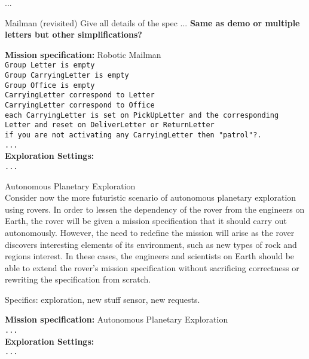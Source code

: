 ...

\begin{myExample}\label{Ex:mailman3} Mailman (revisited)
	Give all details of the spec ... \textbf{Same as demo or multiple letters but other simplifications?}
\end{myExample}

\begin{algorithm}
	\textbf{Mission specification:} Robotic Mailman\\
	{\small
	\texttt{Group Letter is empty}\\
	\texttt{Group CarryingLetter is empty}\\
	\texttt{Group Office is empty}\\
	\texttt{CarryingLetter correspond to Letter}\\
	\texttt{CarryingLetter correspond to Office}\\
	\texttt{each CarryingLetter is set on PickUpLetter and the corresponding Letter and reset on 			DeliverLetter or ReturnLetter}\\
	
	\texttt{if you are not activating any CarryingLetter then "patrol"?.}\\
	\texttt{...}\\
	}
	\textbf{Exploration Settings:}\\
	{\small
	\texttt{...} 
	}
\end{algorithm}

\begin{myExample}\label{Ex:planetxplore} Autonomous Planetary Exploration\\
	Consider now the more futuristic scenario of autonomous planetary exploration using rovers. In order to lessen the dependency of the rover from the engineers on Earth, the rover will be given a mission specification that it should carry out autonomously. However, the need to redefine the mission will arise as the rover discovers interesting elements of its environment, such as new types of rock and regions interest. In these cases, the engineers and scientists on Earth should be able to extend the rover's mission specification without sacrificing correctness or rewriting the specification from scratch.
	
	Specifics: exploration, new stuff sensor, new requests.
\end{myExample}

\begin{algorithm}
	\textbf{Mission specification:} Autonomous Planetary Exploration\\
	{\small
	\texttt{...}\\
	}
	\textbf{Exploration Settings:}\\
	{\small
	\texttt{...} 
	}
\end{algorithm}

